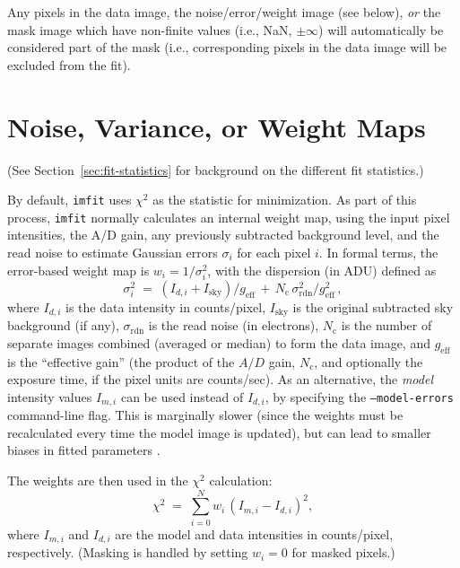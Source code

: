 \documentclass[10pt,a4paper,article]{memoir}
\newcommand{\imfitprog}{\texttt{imfit}}
\newcommand{\chisquare}{\ensuremath{\chi^{2}}}
\begin{document}
Any pixels in the data image, the noise/error/weight image (see below),
\textit{or} the mask image which have non-finite values (i.e., NaN,
$\pm\infty$) will automatically be considered part of the mask (i.e.,
corresponding pixels in the data image will be excluded from the fit).


\section{Noise, Variance, or Weight Maps}\label{sec:noise-maps}

(See Section~\ref{sec:fit-statistics} for background on the different fit statistics.)

By default, \imfitprog{} uses \chisquare{} as the statistic for
minimization. As part of this process, \imfitprog{} normally calculates an internal
weight map, using the input pixel intensities, the A/D gain, any
previously subtracted background level, and the read noise to estimate
Gaussian errors $\sigma_{i}$ for each pixel $i$. In formal terms, the error-based weight
map is $w_{i} = 1/\sigma^{2}_{i}$, with the dispersion (in ADU) defined as
\begin{equation}
\sigma^{2}_{i} \; = \; (I_{d, i} + I_{\mathrm{sky}})/g_{\mathrm{eff}} \, + \, N_{\mathrm{c}} \, \sigma_{\mathrm{rdn}}^{2}/g_{\mathrm{eff}}^{2} \, ,
\end{equation}
where $I_{d, i}$ is the data intensity in counts/pixel,
$I_{\mathrm{sky}}$ is the original subtracted sky background (if any),
$\sigma_{\mathrm{rdn}}$ is the read noise (in electrons),
$N_{\mathrm{c}}$ is the number of separate images combined (averaged or
median) to form the data image, and $g_{\mathrm{eff}}$ is the
``effective gain'' (the product of the $A/D$ gain,  $N_{\mathrm{c}}$,
and optionally the exposure time, if the pixel units are counts/sec).
As an alternative, the \textit{model} intensity values $I_{m, i}$ can be
used instead of $I_{d, i}$, by specifying the \texttt{--model-errors}
command-line flag. This is marginally slower (since the weights must be
recalculated every time the model image is updated), but can lead to
smaller biases in fitted parameters \citep[see][]{humphrey09,erwin15}.

The weights are then used in the \chisquare{} calculation:
\begin{equation}
\chisquare \; = \; \sum_{i = 0}^{N} w_{i} \, (I_{m, i} - I_{d, i})^2 ,
\end{equation}
where $I_{m, i}$ and $I_{d, i}$ are the model and data intensities
in counts/pixel, respectively. (Masking is handled by setting $w_{i} = 0$
for masked pixels.)
\end{document}
